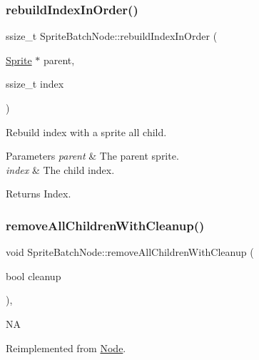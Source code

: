 \subsubsection{\texorpdfstring{rebuild\+Index\+In\+Order()}{rebuildIndexInOrder()}\hspace{0.1cm}{\footnotesize\ttfamily [2/2]}}
{\footnotesize\ttfamily ssize\+\_\+t Sprite\+Batch\+Node\+::rebuild\+Index\+In\+Order (\begin{DoxyParamCaption}\item[{\hyperlink{classSprite}{Sprite} $\ast$}]{parent,  }\item[{ssize\+\_\+t}]{index }\end{DoxyParamCaption})}

Rebuild index with a sprite all child.


\begin{DoxyParams}{Parameters}
{\em parent} & The parent sprite. \\
\hline
{\em index} & The child index. \\
\hline
\end{DoxyParams}
\begin{DoxyReturn}{Returns}
Index. 
\end{DoxyReturn}
\mbox{\label{classSpriteBatchNode_a1b49c2764f43641c912c66c2d58b85a0}} 
\subsubsection{\texorpdfstring{remove\+All\+Children\+With\+Cleanup()}{removeAllChildrenWithCleanup()}\hspace{0.1cm}{\footnotesize\ttfamily [1/2]}}
{\footnotesize\ttfamily void Sprite\+Batch\+Node\+::remove\+All\+Children\+With\+Cleanup (\begin{DoxyParamCaption}\item[{bool}]{cleanup }\end{DoxyParamCaption})\hspace{0.3cm}{\ttfamily [override]}, {\ttfamily [virtual]}}

NA 

Reimplemented from \hyperlink{classNode_aca66e2b385c3dbf1a6f55627c4a13192}{Node}.

\mbox{\label{classSpriteBatchNode_aef759fbb4337b71813e05bf91a0daae8}} 
